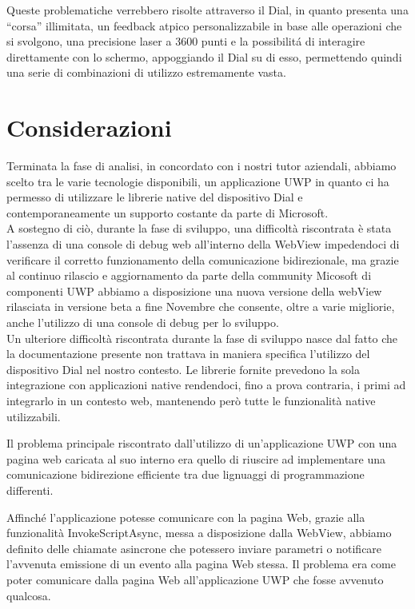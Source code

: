 Queste problematiche verrebbero risolte attraverso il Dial, in quanto presenta una “corsa” illimitata, un feedback atpico personalizzabile in base alle operazioni che si svolgono, una precisione laser a 3600 punti e la possibilitá di interagire direttamente con lo schermo, appoggiando il Dial su di esso, permettendo quindi una serie di combinazioni di utilizzo estremamente vasta.

\section{Considerazioni}
Terminata la fase di analisi, in concordato con i nostri tutor aziendali, abbiamo scelto tra le varie tecnologie disponibili, un applicazione UWP in quanto ci ha permesso di utilizzare le librerie native del dispositivo Dial e contemporaneamente un supporto costante da parte di Microsoft.\\

A sostegno di ciò, durante la fase di sviluppo, una difficoltà riscontrata è stata l'assenza di una console di debug web all'interno della WebView impedendoci di verificare il corretto funzionamento della comunicazione bidirezionale, ma grazie al continuo rilascio e aggiornamento da parte della community Micosoft di componenti UWP abbiamo a disposizione una nuova versione della webView rilasciata in versione beta a fine Novembre che consente, oltre a varie migliorie, anche l'utilizzo di una console di debug per lo sviluppo.\\

Un ulteriore difficoltà riscontrata durante la fase di sviluppo nasce dal fatto che la documentazione presente non trattava in maniera specifica l'utilizzo del dispositivo Dial nel nostro contesto.
Le librerie fornite prevedono la sola integrazione con applicazioni native rendendoci, fino a prova contraria, i primi ad integrarlo in un contesto web, mantenendo però tutte le funzionalità native utilizzabili.

Il problema principale riscontrato dall'utilizzo di un'applicazione UWP con una pagina web caricata al suo interno era quello di riuscire ad implementare una comunicazione bidirezione efficiente tra due lignuaggi di programmazione differenti.

Affinché l'applicazione potesse comunicare con la pagina Web, grazie alla funzionalità InvokeScriptAsync, messa a disposizione dalla WebView, abbiamo definito delle chiamate asincrone che potessero inviare parametri o notificare l'avvenuta emissione di un evento alla pagina Web stessa. Il problema era come poter comunicare dalla pagina Web all'applicazione UWP che fosse avvenuto qualcosa.\\

